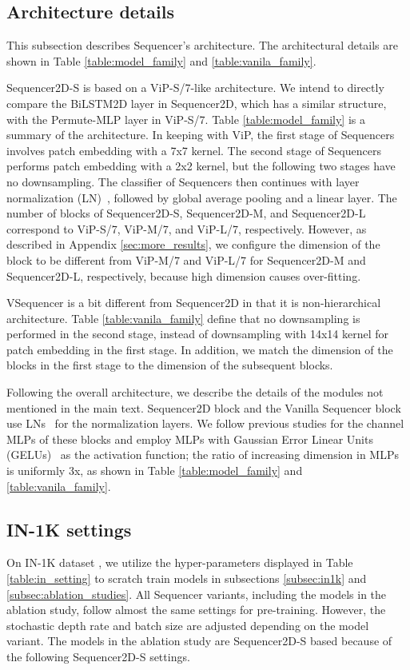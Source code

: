 \documentclass{article}
\begin{document}
\subsection{Architecture details}
\label{subsec:architecture_details}

This subsection describes Sequencer's architecture. The architectural details are shown in Table \ref{table:model_family} and \ref{table:vanila_family}.

Sequencer2D-S is based on a ViP-S/7-like architecture. We intend to directly compare the BiLSTM2D layer in Sequencer2D, which has a similar structure, with the Permute-MLP layer in ViP-S/7. Table \ref{table:model_family} is a summary of the architecture. In keeping with ViP, the first stage of Sequencers involves patch embedding with a 7x7 kernel. The second stage of Sequencers performs patch embedding with a 2x2 kernel, but the following two stages have no downsampling. The classifier of Sequencers then continues with layer normalization (LN)~\cite{ba2016layer}, followed by global average pooling and a linear layer. The number of blocks of Sequencer2D-S, Sequencer2D-M, and Sequencer2D-L correspond to ViP-S/7, ViP-M/7, and ViP-L/7, respectively. However, as described in Appendix \ref{sec:more_results}, we configure the dimension of the block to be different from ViP-M/7 and ViP-L/7 for Sequencer2D-M and Sequencer2D-L, respectively, because high dimension causes over-fitting.

VSequencer is a bit different from Sequencer2D in that it is non-hierarchical architecture. Table \ref{table:vanila_family} define that no downsampling is performed in the second stage, instead of downsampling with 14x14 kernel for patch embedding in the first stage. In addition, we match the dimension of the blocks in the first stage to the dimension of the subsequent blocks.

Following the overall architecture, we describe the details of the modules not mentioned in the main text. Sequencer2D block and the Vanilla Sequencer block use LNs~\cite{ba2016layer} for the normalization layers. We follow previous studies for the channel MLPs of these blocks and employ MLPs with Gaussian Error Linear Units (GELUs)~\cite{hendrycks2016gaussian} as the activation function; the ratio of increasing dimension in MLPs is uniformly 3x, as shown in Table \ref{table:model_family} and \ref{table:vanila_family}.

\subsection{IN-1K settings}
\label{subsec:in1k_settings}
On IN-1K dataset \cite{krizhevsky2012imagenet}, we utilize the hyper-parameters displayed in Table \ref{table:in_setting} to scratch train models in subsections \ref{subsec:in1k} and \ref{subsec:ablation_studies}. All Sequencer variants, including the models in the ablation study, follow almost the same settings for pre-training. However, the stochastic depth rate and batch size are adjusted depending on the model variant. The models in the ablation study are Sequencer2D-S based because of the following Sequencer2D-S settings.
\end{document}
